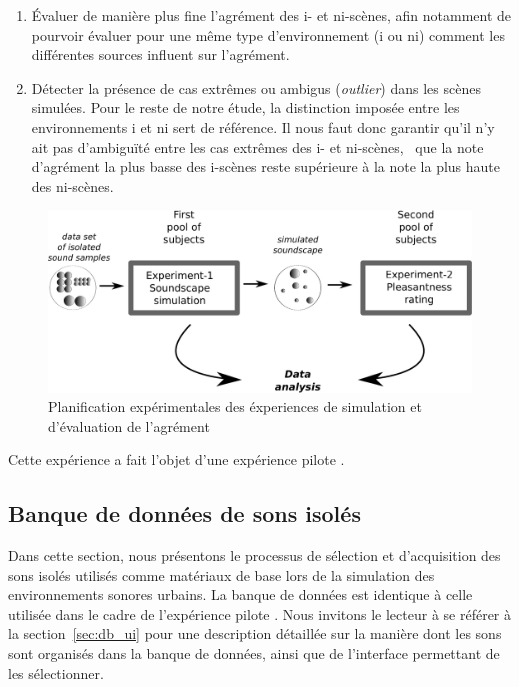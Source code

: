 \begin{enumerate}
\item Évaluer de manière plus fine l'agrément des i- et ni-scènes, afin notamment de pourvoir évaluer pour une même type d'environnement (i ou ni) comment les différentes sources influent sur l'agrément.
\item Détecter la présence de cas extrêmes ou ambigus (\emph{outlier}) dans les scènes simulées. Pour le reste de notre étude, la distinction imposée entre les environnements i et ni sert de référence. Il nous faut donc garantir qu'il n'y ait pas d’ambiguïté entre les cas extrêmes des i- et ni-scènes, \ie~que la note d'agrément la plus basse des i-scènes reste supérieure à la note la plus haute des ni-scènes.
\end{enumerate}

\begin{figure}[t]
        \myfloatalign
        \includegraphics[width=.8\linewidth]{gfx/5-eps-converted-to}
        \caption{Planification expérimentales des éxperiences de simulation et d'évaluation de l'agrément}\label{fig:xp1_2}
\end{figure}

Cette expérience a fait l'objet d'une expérience pilote \citep{lafay2013atiam,lafay2014new}.

\subsection{Banque de données de sons isolés}

Dans cette section, nous présentons le processus de sélection et d'acquisition des sons isolés utilisés comme matériaux de base lors de la simulation des environnements sonores urbains. La banque de données est identique à celle utilisée dans le cadre de l'expérience pilote \citep{lafay2013atiam,lafay2014new}. Nous invitons le lecteur à se référer à la section~\ref{sec:db_ui} pour une description détaillée sur la manière dont les sons sont organisés dans la banque de données, ainsi que de l'interface permettant de les sélectionner. 

